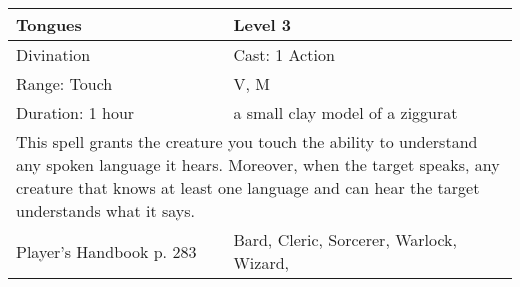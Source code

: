 \documentclass[11pt]{report}
\begin{document}
\begin{table}[H]
	\begin{tabular}{||p{6cm}|p{6cm}||}
		\hline\hline
		\bf{Tongues} & Level 3\\ \hline
		Divination & Cast: 1 Action\\ \hline
		Range: Touch & V, M\\ \hline
		Duration: 1 hour & a small clay model of a ziggurat\\ \hline
		\multicolumn{2}{||p{12cm}||}{This spell grants the creature you touch the ability to understand any spoken language it hears. Moreover, when the target speaks, any creature that knows at least one language and can hear the target understands what it says.}\\ \hline
Player's Handbook p. 283 & Bard, Cleric, Sorcerer, Warlock, Wizard, \\ \hline\hline
	\end{tabular}
\end{table}
\end{document}
